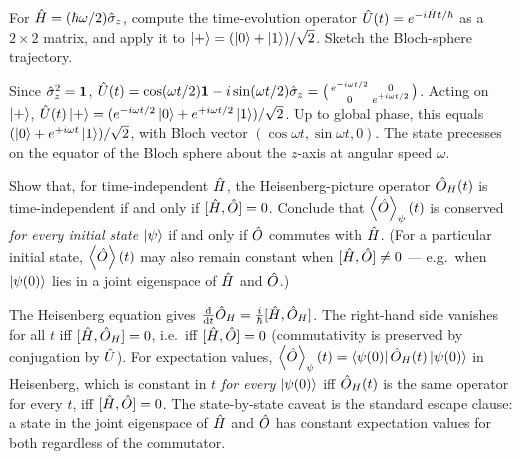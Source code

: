 \begin{exercise}
For $\hat{H}=(\hbar\omega/2)\hat\sigma_z$, compute the time-evolution
operator $\hat{U}(t)=e^{-i\hat{H}t/\hbar}$ as a $2\times 2$ matrix,
and apply it to $\ket{+}=(\ket{0}+\ket{1})/\sqrt 2$. Sketch the
Bloch-sphere trajectory.
\begin{solution}
Since $\hat\sigma_z^2=\mathbf{1}$,
$\hat{U}(t)=\cos(\omega t/2)\mathbf{1}-i\sin(\omega t/2)\hat\sigma_z
=\bigl(\begin{smallmatrix}e^{-i\omega t/2}&0\\0&e^{+i\omega t/2}\end{smallmatrix}\bigr)$.
Acting on $\ket{+}$,
$\hat{U}(t)\ket{+}=(e^{-i\omega t/2}\ket{0}+e^{+i\omega t/2}\ket{1})/\sqrt 2$.
Up to global phase, this equals
$(\ket{0}+e^{+i\omega t}\ket{1})/\sqrt 2$, with Bloch vector
$(\cos\omega t,\sin\omega t,0)$. The state precesses on the equator
of the Bloch sphere about the $z$-axis at angular speed $\omega$.
\end{solution}
\end{exercise}

\begin{exercise}
Show that, for time-independent $\hat{H}$, the Heisenberg-picture
operator $\hat{O}_H(t)$ is time-independent if and only if
$[\hat{H},\hat{O}]=0$. Conclude that
$\expval{\hat{O}}_\psi(t)$ is conserved \emph{for every initial
state $\ket{\psi}$} if and only if $\hat{O}$ commutes with $\hat{H}$.
(For a particular initial state, $\expval{\hat{O}}(t)$ may also
remain constant when $[\hat{H},\hat{O}]\neq0$ --- e.g.\ when
$\ket{\psi(0)}$ lies in a joint eigenspace of $\hat{H}$ and
$\hat{O}$.)
\begin{solution}
The Heisenberg equation gives
$\dv{t}\hat{O}_H=\tfrac{i}{\hbar}[\hat{H},\hat{O}_H]$. The right-hand
side vanishes for all $t$ iff $[\hat{H},\hat{O}_H]=0$, i.e.\ iff
$[\hat{H},\hat{O}]=0$ (commutativity is preserved by conjugation by
$\hat{U}$). For expectation values,
$\expval{\hat{O}}_\psi(t)=\bra{\psi(0)}\hat{O}_H(t)\ket{\psi(0)}$ in
Heisenberg, which is constant in $t$ \emph{for every $\ket{\psi(0)}$}
iff $\hat{O}_H(t)$ is the same operator for every $t$, iff
$[\hat{H},\hat{O}]=0$. The state-by-state caveat is the standard
escape clause: a state in the joint eigenspace of $\hat{H}$ and
$\hat{O}$ has constant expectation values for both regardless of
the commutator.
\end{solution}
\end{exercise}

